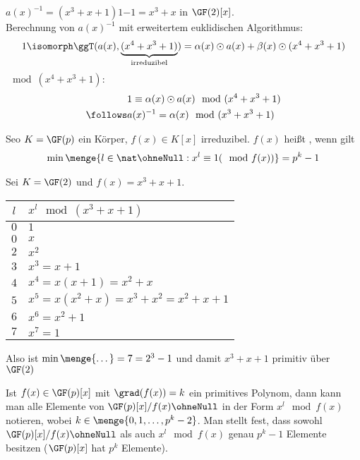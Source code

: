 \begin{bem}
	$a(x)^{-1} = (x^3+x+1)1{-1} = x^3+x$ in $\GF(2)[x]$. \\
	Berechnung von $a(x)^{-1}$ mit erweitertem euklidischen Algorithmus:
	\begin{align*}
		1 \isomorph \ggT(a(x), \underbrace{(x^4+x^3+1)}_{\text{irreduzibel}}) = \alpha(x) \odot a(x) + \beta(x) \odot (x^4+x^3+1)
	\end{align*}
	$\mod (x^4 + x^3 + 1)$:
	\begin{align*}
		&1 \equiv \alpha(x) \odot  a(x) \mod (x^4+x^3+1) \\
		\follows &a(x)^{-1} = \alpha(x) \mod (x^3+x^3+1)
	\end{align*}
\end{bem}

\begin{defin}
	Seo $K = \GF(p)$ ein Körper, $f(x) \in K[x]$ irreduzibel. $f(x)$ heißt , wenn gilt
	\begin{align*}
		\min \menge{l \in \nat\ohneNull : x^l \equiv 1 (\mod f(x))} = p^k -1
	\end{align*}
\end{defin}

\newpage
\begin{bsp}
	Sei $K = \GF(2)$ und $f(x) = x^3 + x + 1$.
	\begin{table}[h]
		\centering
		\begin{tabular}{|c|l|}
			\hline 
			$l$ & $x^l \mod (x^3 + x + 1)$ \\ 
			\hline 
			$0$ & $1$ \\ 
			\hline 
			$0$ & $x$ \\ 
			\hline 
			$2$ & $x^2$  \\ 
			\hline 
			$3$ & $x^3 = x+1$  \\ 
			\hline 
			$4$ & $x^4 = x(x+1) = x^2 + x$  \\ 
			\hline 
			$5$ & $x^5 = x(x^2+x) = x^3 + x^2 = x^2 + x + 1$ \\
			\hline
			$6$ & $x^6 = x^2 +1$ \\
			\hline
			$7$ & $x^7 = 1$ \\
			\hline
		\end{tabular} 
	\end{table}
	Also ist $\min \menge{\dots} = 7 = 2^3 - 1$ und damit $x^3+x+1$ primitiv über $\GF(2)$
\end{bsp}

\begin{bem}
	Ist $f(x) \in \GF(p)[x]$ mit $\grad(f(x)) = k$ ein primitives Polynom, dann kann man alle Elemente von $\GF(p)[x] / f(x) \ohneNull$ in der Form $x^l \mod f(x)$ notieren, wobei $k \in \menge{0,1,\dots, p^k-2}$. Man stellt fest, dass sowohl $\GF(p)[x] / f(x) \ohneNull$ als auch $x^l \mod f(x)$ genau $p^k-1$ Elemente besitzen ($\GF(p)[x]$ hat $p^k$ Elemente).
\end{bem}